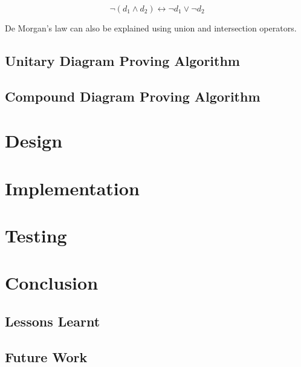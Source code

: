 \documentclass[a4paper]{article}
\begin{document}
$$ \neg(d_{1} \wedge d_{2}) \longleftrightarrow \neg d_{1} \vee \neg d_{2} $$

De Morgan's law can also be explained using union and intersection operators. 
\subsection{Unitary Diagram Proving Algorithm}

\subsection{Compound Diagram Proving Algorithm}



\section{Design}

\section{Implementation}

\section{Testing}

\section{Conclusion}
\subsection{Lessons Learnt}
\subsection{Future Work}
\newpage
	
\end{document}
